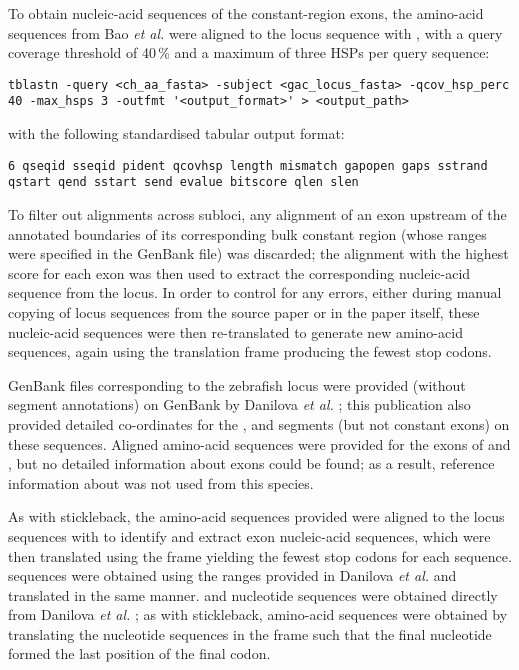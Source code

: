 To obtain nucleic-acid sequences of the constant-region exons, the amino-acid sequences from Bao \textit{et al.} \parencite{bao2010stickleback} were aligned to the locus sequence with  \parencite{gertz2006tblastn}, with a query coverage threshold of 40\,\% and a maximum of three HSPs per query sequence:

\begin{lstlisting}
tblastn -query <ch_aa_fasta> -subject <gac_locus_fasta> -qcov_hsp_perc 40 -max_hsps 3 -outfmt '<output_format>' > <output_path>
\end{lstlisting}

\noindent with the following standardised tabular output format: 

\begin{lstlisting}
6 qseqid sseqid pident qcovhsp length mismatch gapopen gaps sstrand qstart qend sstart send evalue bitscore qlen slen
\end{lstlisting}

\noindent To filter out alignments across subloci, any alignment of an exon upstream of the annotated boundaries of its corresponding bulk constant region (whose ranges were specified in the GenBank file) was discarded; the alignment with the highest score for each exon was then used to extract the corresponding nucleic-acid sequence from the locus. In order to control for any errors, either during manual copying of locus sequences from the source paper or in the paper itself, these nucleic-acid sequences were then re-translated to generate new amino-acid sequences, again using the translation frame producing the fewest stop codons.


\noindent GenBank files corresponding to the zebrafish \igh{} locus were provided (without segment annotations) on GenBank by Danilova \textit{et al.} \parencite{danilova2005zebrafish}; this publication also provided detailed co-ordinates for the \vh, \dh and \jh segments (but not constant exons) on these sequences. Aligned amino-acid sequences were provided for the exons of  and , but no detailed information about  exons could be found; as a result, reference information about  was not used from this species.

As with stickleback, the amino-acid sequences provided were aligned to the locus sequences  with  to identify and extract exon nucleic-acid sequences, which were then translated using the frame yielding the fewest stop codons for each sequence. \vh sequences were obtained using the ranges provided in Danilova \textit{et al.} \parencite{danilova2005zebrafish} and translated in the same manner. \dh and \jh nucleotide sequences were obtained directly from Danilova \textit{et al.} \parencite{danilova2005zebrafish}; as with stickleback, \jh amino-acid sequences were obtained by translating the nucleotide sequences in the frame such that the final nucleotide formed the last position of the final codon.

